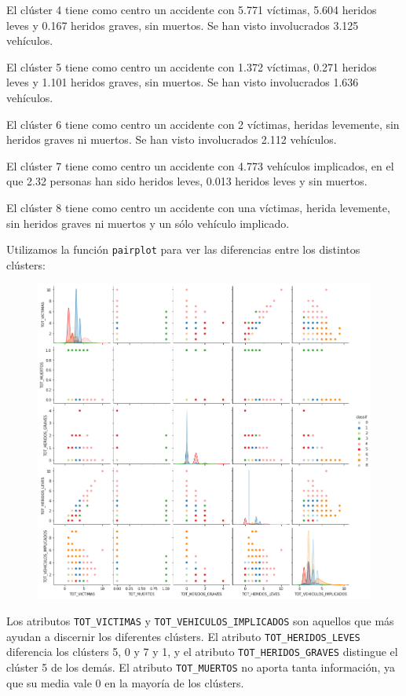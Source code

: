 \documentclass[a4]{article}
\begin{document}
El clúster 4 tiene como centro un accidente con 5.771 víctimas, 5.604 heridos leves y 0.167 heridos graves, sin muertos. Se han visto involucrados 3.125 vehículos.

El clúster 5 tiene como centro un accidente con 1.372 víctimas, 0.271 heridos leves y 1.101 heridos graves, sin muertos. Se han visto involucrados 1.636 vehículos.

El clúster 6 tiene como centro un accidente con 2 víctimas, heridas levemente, sin heridos graves ni muertos. Se han visto involucrados 2.112 vehículos.

El clúster 7 tiene como centro un accidente con 4.773 vehículos implicados, en el que 2.32 personas han sido heridos leves, 0.013 heridos leves y sin muertos.

El clúster 8 tiene como centro un accidente con una víctimas, herida levemente, sin heridos graves ni muertos y un sólo vehículo implicado.

Utilizamos la función \texttt{pairplot} para ver las diferencias entre los distintos clústers:

\begin{figure}[H]
  \centering
  \includegraphics[width=180mm]{imagenes/c2_kmeans_pairplot}
\end{figure}

Los atributos \texttt{TOT\_VICTIMAS} y \texttt{TOT\_VEHICULOS\_IMPLICADOS} son aquellos que más ayudan a discernir los diferentes clústers. El atributo \texttt{TOT\_HERIDOS\_LEVES} diferencia los clústers 5, 0 y 7 y 1, y el atributo \texttt{TOT\_HERIDOS\_GRAVES} distingue el clúster 5 de los demás. El atributo \texttt{TOT\_MUERTOS} no aporta tanta información, ya que su media vale 0 en la mayoría de los clústers.
\end{document}
